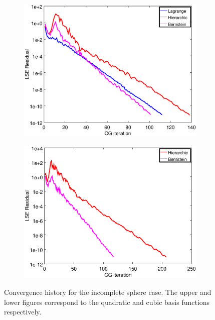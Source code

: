 \documentclass[letter,12pt]{article}
\begin{document}
\begin{figure}
  \centering
  \begin{subfigure}{0.65\textwidth}
    \includegraphics[width=.95\linewidth,center]{sphere-second-convergence.eps}
  \end{subfigure}
  \begin{subfigure}{0.65\textwidth}
    \includegraphics[width=.95\linewidth,center]{sphere-third-convergence.eps}
  \end{subfigure}
  \caption{Convergence history for the incomplete sphere case. The upper and
    lower figures correspond to the quadratic and cubic basis
    functions respectively.}
  \label{fig:sphere-conv}
\end{figure}
\end{document}
